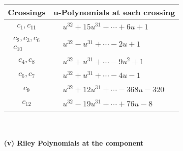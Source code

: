 \documentclass[1p]{elsarticle_modified}
\theoremstyle{definition}
\begin{document}
\begin{tabular}{m{50pt}|m{274pt}}
Crossings & \hspace{64pt}u-Polynomials at each crossing \\
\hline $$\begin{aligned}c_{1},c_{11}\end{aligned}$$&$\begin{aligned}
&u^{32}+15 u^{31}+\cdots+6 u+1
\end{aligned}$\\
\hline $$\begin{aligned}c_{2},c_{3},c_{6}\\c_{10}\end{aligned}$$&$\begin{aligned}
&u^{32}- u^{31}+\cdots-2 u+1
\end{aligned}$\\
\hline $$\begin{aligned}c_{4},c_{8}\end{aligned}$$&$\begin{aligned}
&u^{32}+u^{31}+\cdots-9 u^2+1
\end{aligned}$\\
\hline $$\begin{aligned}c_{5},c_{7}\end{aligned}$$&$\begin{aligned}
&u^{32}+u^{31}+\cdots-4 u-1
\end{aligned}$\\
\hline $$\begin{aligned}c_{9}\end{aligned}$$&$\begin{aligned}
&u^{32}+12 u^{31}+\cdots-368 u-320
\end{aligned}$\\
\hline $$\begin{aligned}c_{12}\end{aligned}$$&$\begin{aligned}
&u^{32}-19 u^{31}+\cdots+76 u-8
\end{aligned}$\\
\hline
\end{tabular}\\~\\
\newpage\renewcommand{\arraystretch}{1}
\flushleft \textbf{(v) Riley Polynomials at the component}\newline \\
\end{document}
